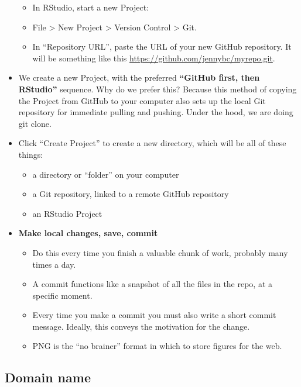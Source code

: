 \documentclass[
]{article}
\providecommand{\tightlist}{%
  \setlength{\itemsep}{0pt}\setlength{\parskip}{0pt}}
\begin{document}
\begin{itemize}
  \begin{itemize}
  \tightlist
  \item
    In RStudio, start a new Project:
  \item
    File \textgreater{} New Project \textgreater{} Version Control \textgreater{} Git.
  \item
    In ``Repository URL'', paste the URL of your new GitHub
    repository. It will be something like this
    \url{https://github.com/jennybc/myrepo.git}.
  \end{itemize}
\item
  We create a new Project, with the preferred \textbf{``GitHub first, then
  RStudio''} sequence. Why do we prefer this? Because this method of
  copying the Project from GitHub to your computer also sets up the
  local Git repository for immediate pulling and pushing. Under the
  hood, we are doing git clone.
\item
  Click ``Create Project'' to create a new directory, which will be all
  of these things:

  \begin{itemize}
  \tightlist
  \item
    a directory or ``folder'' on your computer
  \item
    a Git repository, linked to a remote GitHub repository
  \item
    an RStudio Project
  \end{itemize}
\item
  \textbf{Make local changes, save, commit}

  \begin{itemize}
  \tightlist
  \item
    Do this every time you finish a valuable chunk of work, probably
    many times a day.
  \item
    A commit functions like a snapshot of all the files in the repo,
    at a specific moment.
  \item
    Every time you make a commit you must also write a short commit
    message. Ideally, this conveys the motivation for the change.
  \item
    PNG is the ``no brainer'' format in which to store figures for the
    web.
  \end{itemize}
\end{itemize}

\hypertarget{domain-name}{%
\subsection{Domain name}\label{domain-name}}
\end{document}
